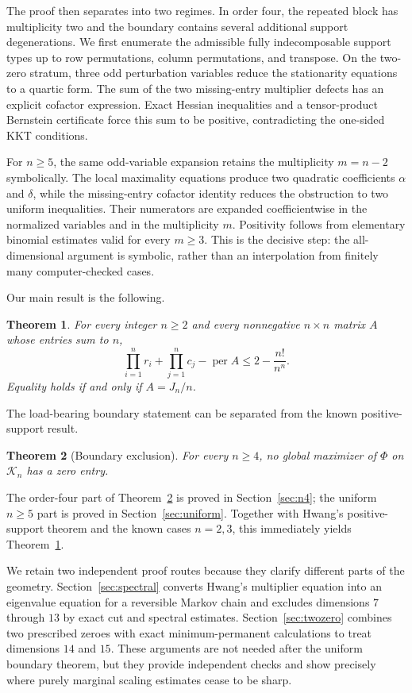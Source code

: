 \documentclass[11pt]{amsart}
\newtheorem{theorem}{Theorem}[section]
\theoremstyle{definition}
\theoremstyle{remark}
\begin{document}
The proof then separates into two regimes.  In order four, the repeated
block has multiplicity two and the boundary contains several additional
support degenerations.  We first enumerate the admissible fully
indecomposable support types up to row permutations, column permutations,
and transpose.  On the two-zero stratum, three odd perturbation variables
reduce the stationarity equations to a quartic form.  The sum of the two
missing-entry multiplier defects has an explicit cofactor expression.
Exact Hessian inequalities and a tensor-product Bernstein certificate
force this sum to be positive, contradicting the one-sided KKT conditions.

For \(n\geq5\), the same odd-variable expansion retains the multiplicity
\(m=n-2\) symbolically.  The local maximality equations produce two
quadratic coefficients \(\alpha\) and \(\delta\), while the missing-entry
cofactor identity reduces the obstruction to two uniform inequalities.
Their numerators are expanded coefficientwise in the normalized variables
and in the multiplicity \(m\).  Positivity follows from elementary
binomial estimates valid for every \(m\geq3\).  This is the decisive step:
the all-dimensional argument is symbolic, rather than an interpolation
from finitely many computer-checked cases.

Our main result is the following.

\begin{theorem}\label{thm:dittert}
For every integer \(n\geq2\) and every nonnegative \(n\times n\) matrix
\(A\) whose entries sum to \(n\),
\[
 \prod_{i=1}^n r_i+\prod_{j=1}^n c_j-
 \operatorname{per}A
 \leq 2-\frac{n!}{n^n}.
\]
Equality holds if and only if \(A=J_n/n\).
\end{theorem}

The load-bearing boundary statement can be separated from the known
positive-support result.

\begin{theorem}[Boundary exclusion]\label{thm:boundary-exclusion}
For every \(n\geq4\), no global maximizer of \(\Phi\) on \(\mathcal K_n\)
has a zero entry.
\end{theorem}

The order-four part of Theorem~\ref{thm:boundary-exclusion} is proved in
Section~\ref{sec:n4}; the uniform \(n\geq5\) part is proved in
Section~\ref{sec:uniform}.  Together with Hwang's positive-support theorem
and the known cases \(n=2,3\), this immediately yields
Theorem~\ref{thm:dittert}.

We retain two independent proof routes because they clarify different
parts of the geometry.  Section~\ref{sec:spectral} converts Hwang's
multiplier equation into an eigenvalue equation for a reversible Markov
chain and excludes dimensions \(7\) through \(13\) by exact cut and
spectral estimates.  Section~\ref{sec:twozero} combines two prescribed
zeroes with exact minimum-permanent calculations to treat dimensions
\(14\) and \(15\).  These arguments are not needed after the uniform
boundary theorem, but they provide independent checks and show precisely
where purely marginal scaling estimates cease to be sharp.
\end{document}
